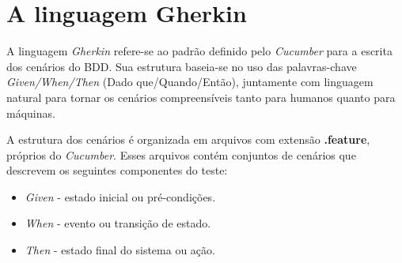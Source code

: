 




\section{\textbf{A linguagem Gherkin}}
A linguagem \textit{Gherkin} refere-se ao padrão definido pelo \textit{Cucumber} \cite{cucumberDocs} para a escrita dos cenários do BDD. Sua estrutura baseia-se no uso das palavras-chave 
\textit{Given/When/Then} (Dado que/Quando/Então), juntamente com linguagem natural para tornar os cenários compreensíveis tanto para humanos quanto para máquinas. 

A estrutura dos cenários é organizada em arquivos com extensão \textbf{.feature}, próprios do \textit{Cucumber}. Esses arquivos contém conjuntos de cenários que descrevem os seguintes componentes do teste:

\begin{itemize}
	\item \textit{Given} - estado inicial ou pré-condições.
	\item \textit{When} - evento ou transição de estado.
	\item \textit{Then} - estado final do sistema ou ação.
\end{itemize}

